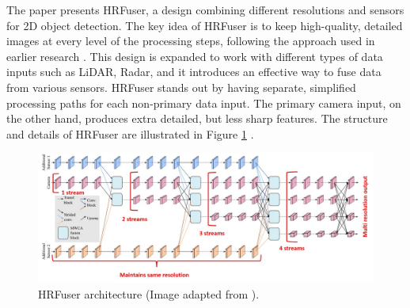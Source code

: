 \documentclass[report.tex]{subfiles}
\begin{document}

    The paper presents HRFuser, a design combining different resolutions and sensors for 2D object detection. The key idea of HRFuser is to keep high-quality, detailed images at every level of the processing steps, following the approach used in earlier research \cite{wang2020hrnet} \cite{yuan2021hrformer}. This design is expanded to work with different types of data inputs such as LiDAR, Radar, and it introduces an effective way to fuse data from various sensors. HRFuser stands out by having separate, simplified processing paths for each non-primary data input. The primary camera input, on the other hand, produces extra detailed, but less sharp features. The structure and details of HRFuser are illustrated in Figure \ref{fig:hrfuser_architecture} \cite{broedermann2022hrfuser}.

    \begin{figure}[h]
        \centering
        \includegraphics[width=1.0\textwidth]{images/methods/hrfuser/architecture_annotated.png}
        \caption{HRFuser architecture (Image adapted from \cite{broedermann2022hrfuser}).}
        \label{fig:hrfuser_architecture}
    \end{figure}
\end{document}
